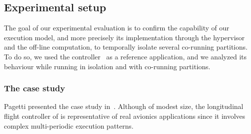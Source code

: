 \documentclass[main.tex]{subfiles}
\begin{document}
\subsection{Experimental setup}
The goal of our experimental evaluation is to confirm the capability of our execution model, and more precisely its implementation through the hypervisor and the off-line computation, to temporally isolate several co-running partitions. To do so, we used the \rosace controller~\cite{Pagetti2014} as a reference application, and we analyzed its behaviour while running in isolation and with co-running partitions.


\subsubsection{The \rosace case study}
Pagetti \etal presented the \rosace case study in~\cite{Pagetti2014}. Although of modest size, the longitudinal flight controller of \rosace is representative of real avionics applications since it involves complex multi-periodic execution patterns.
\end{document}

